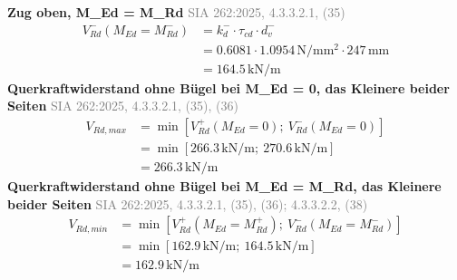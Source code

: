 \documentclass[11pt,a4paper]{article}
\newcommand{\normref}[1]{{\small\textcolor{gray}{#1}}}
\begin{document}
\noindent\textbf{Zug oben, M\_Ed = M\_Rd} \hfill \normref{SIA 262:2025, 4.3.3.2.1, (35)}
\begin{equation*}
\begin{aligned}
  V_{Rd}^{-}(M_{Ed} = M_{Rd}^{-}) &= k_d^{-} \cdot \tau_{cd} \cdot d_v^{-} \\
  &= 0.6081 \cdot 1.0954\,\mathrm{N}/\mathrm{mm}^{2} \cdot 247\,\mathrm{mm} \\
  &= 164.5\,\mathrm{kN}/\mathrm{m}
\end{aligned}
\end{equation*}
\noindent\textbf{Querkraftwiderstand ohne Bügel bei M\_Ed = 0, das Kleinere beider Seiten} \hfill \normref{SIA 262:2025, 4.3.3.2.1, (35), (36)}
\begin{equation*}
\begin{aligned}
  V_{Rd,max} &= \min\left[V_{Rd}^{+}(M_{Ed} = 0);\ V_{Rd}^{-}(M_{Ed} = 0)\right] \\
  &= \min\left[266.3\,\mathrm{kN}/\mathrm{m};\ 270.6\,\mathrm{kN}/\mathrm{m}\right] \\
  &= 266.3\,\mathrm{kN}/\mathrm{m}
\end{aligned}
\end{equation*}
\noindent\textbf{Querkraftwiderstand ohne Bügel bei M\_Ed = M\_Rd, das Kleinere beider Seiten} \hfill \normref{SIA 262:2025, 4.3.3.2.1, (35), (36); 4.3.3.2.2, (38)}
\begin{equation*}
\begin{aligned}
  V_{Rd,min} &= \min\left[V_{Rd}^{+}(M_{Ed} = M_{Rd}^{+});\ V_{Rd}^{-}(M_{Ed} = M_{Rd}^{-})\right] \\
  &= \min\left[162.9\,\mathrm{kN}/\mathrm{m};\ 164.5\,\mathrm{kN}/\mathrm{m}\right] \\
  &= 162.9\,\mathrm{kN}/\mathrm{m}
\end{aligned}
\end{equation*}
\end{document}
